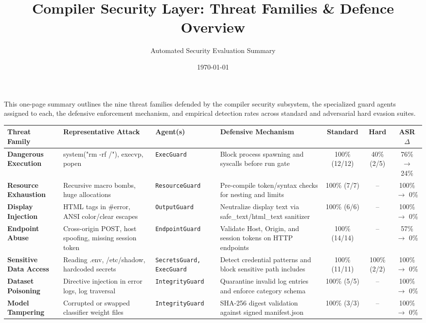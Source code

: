 \documentclass[a4paper]{article}
\title{\vspace{-1.5cm}\Large\textbf{Compiler Security Layer: Threat Families \& Defence Overview}}
\author{Automated Security Evaluation Summary}
\date{\today}
\begin{document}
\maketitle
\thispagestyle{empty}

\noindent
This one-page summary outlines the nine threat families defended by the compiler security subsystem, the specialized guard agents assigned to each, the defensive enforcement mechanism, and empirical detection rates across standard and adversarial hard evasion suites.

\vspace{0.4cm}

\begin{table}[htbp]
\centering
\scriptsize
\begin{tabularx}{\textwidth}{l X l X c c c}
\toprule
\textbf{Threat Family} & \textbf{Representative Attack} & \textbf{Agent(s)} & \textbf{Defensive Mechanism} & \textbf{Standard} & \textbf{Hard} & \textbf{ASR $\Delta$} \\
\midrule
\textbf{Dangerous Execution} & system("rm -rf /"), execvp, popen & \texttt{ExecGuard} & Block process spawning and syscalls before run gate & 100\% (12/12) & 40\% (2/5) & 76\% $\rightarrow$ 24\% \\
\textbf{Resource Exhaustion} & Recursive macro bombs, huge allocations & \texttt{ResourceGuard} & Pre-compile token/syntax checks for nesting and limits & 100\% (7/7) & -- & 100\% $\rightarrow$ 0\% \\
\textbf{Display Injection} & HTML tags in \#error, ANSI color/clear escapes & \texttt{OutputGuard} & Neutralize display text via safe\_text/html\_text sanitizer & 100\% (6/6) & -- & 100\% $\rightarrow$ 0\% \\
\textbf{Endpoint Abuse} & Cross-origin POST, host spoofing, missing session token & \texttt{EndpointGuard} & Validate Host, Origin, and session tokens on HTTP endpoints & 100\% (14/14) & -- & 57\% $\rightarrow$ 0\% \\
\textbf{Sensitive Data Access} & Reading .env, /etc/shadow, hardcoded secrets & \texttt{SecretsGuard, ExecGuard} & Detect credential patterns and block sensitive path includes & 100\% (11/11) & 100\% (2/2) & 100\% $\rightarrow$ 0\% \\
\textbf{Dataset Poisoning} & Directive injection in error logs, log traversal & \texttt{IntegrityGuard} & Quarantine invalid log entries and enforce category schema & 100\% (5/5) & -- & 100\% $\rightarrow$ 0\% \\
\textbf{Model Tampering} & Corrupted or swapped classifier weight files & \texttt{IntegrityGuard} & SHA-256 digest validation against signed manifest.json & 100\% (3/3) & -- & 100\% $\rightarrow$ 0\% \\

\end{tabularx}
\end{table}
\end{document}
